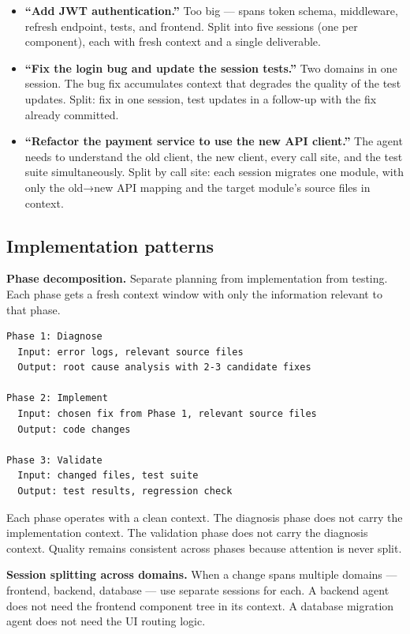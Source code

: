 \documentclass[
  a4paper,
  DIV=11,
  numbers=noendperiod]{scrreprt}
\providecommand{\tightlist}{%
  \setlength{\itemsep}{0pt}\setlength{\parskip}{0pt}}
\begin{document}
\begin{itemize}
\tightlist
\item
  \textbf{``Add JWT authentication.''} Too big --- spans token schema,
  middleware, refresh endpoint, tests, and frontend. Split into five
  sessions (one per component), each with fresh context and a single
  deliverable.
\item
  \textbf{``Fix the login bug and update the session tests.''} Two
  domains in one session. The bug fix accumulates context that degrades
  the quality of the test updates. Split: fix in one session, test
  updates in a follow-up with the fix already committed.
\item
  \textbf{``Refactor the payment service to use the new API client.''}
  The agent needs to understand the old client, the new client, every
  call site, and the test suite simultaneously. Split by call site: each
  session migrates one module, with only the old→new API mapping and the
  target module's source files in context.
\end{itemize}

\subsection{Implementation patterns}\label{implementation-patterns-1}

\textbf{Phase decomposition.} Separate planning from implementation from
testing. Each phase gets a fresh context window with only the
information relevant to that phase.

\begin{verbatim}
Phase 1: Diagnose
  Input: error logs, relevant source files
  Output: root cause analysis with 2-3 candidate fixes

Phase 2: Implement
  Input: chosen fix from Phase 1, relevant source files
  Output: code changes

Phase 3: Validate
  Input: changed files, test suite
  Output: test results, regression check
\end{verbatim}

Each phase operates with a clean context. The diagnosis phase does not
carry the implementation context. The validation phase does not carry
the diagnosis context. Quality remains consistent across phases because
attention is never split.

\textbf{Session splitting across domains.} When a change spans multiple
domains --- frontend, backend, database --- use separate sessions for
each. A backend agent does not need the frontend component tree in its
context. A database migration agent does not need the UI routing logic.
\end{document}
